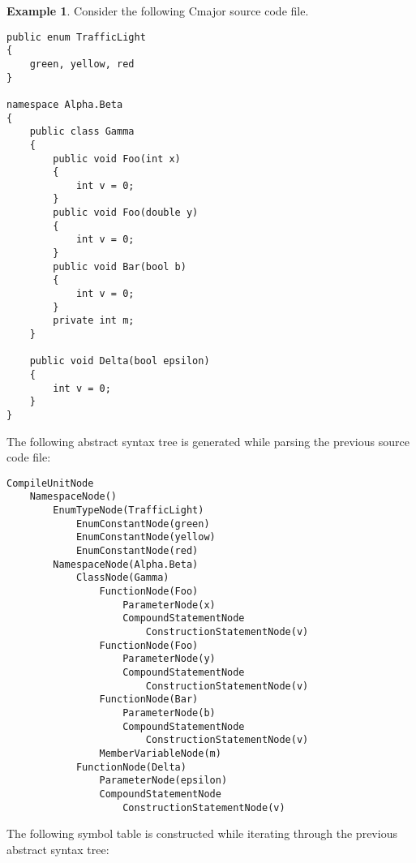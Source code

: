 \documentclass[a4paper,oneside,11pt]{book}
\theoremstyle{definition}
\newtheorem{exmp}{Example}[section]
\begin{document}
\begin{exmp}
Consider the following Cmajor source code file.

\begin{lstlisting}[language=Cmajor,frame=trBL]
public enum TrafficLight
{
    green, yellow, red
}

namespace Alpha.Beta
{
    public class Gamma
    {
        public void Foo(int x)
        {
            int v = 0;
        }
        public void Foo(double y)
        {
            int v = 0;
        }
        public void Bar(bool b)
        {
            int v = 0;
        }
        private int m;
    }

    public void Delta(bool epsilon)
    {
        int v = 0;
    }
}
\end{lstlisting}

\end{exmp}
\clearpage
The following abstract syntax tree is generated while parsing the previous source code file:

\begin{verbatim}
CompileUnitNode
    NamespaceNode()
        EnumTypeNode(TrafficLight)
            EnumConstantNode(green)
            EnumConstantNode(yellow)
            EnumConstantNode(red)
        NamespaceNode(Alpha.Beta)
            ClassNode(Gamma)
                FunctionNode(Foo)
                    ParameterNode(x)
                    CompoundStatementNode
                        ConstructionStatementNode(v)
                FunctionNode(Foo)
                    ParameterNode(y)
                    CompoundStatementNode
                        ConstructionStatementNode(v)
                FunctionNode(Bar)
                    ParameterNode(b)
                    CompoundStatementNode
                        ConstructionStatementNode(v)
                MemberVariableNode(m)
            FunctionNode(Delta)
                ParameterNode(epsilon)
                CompoundStatementNode
                    ConstructionStatementNode(v)
\end{verbatim}

\clearpage
The following symbol table is constructed while iterating through the previous abstract syntax tree:
\end{document}
